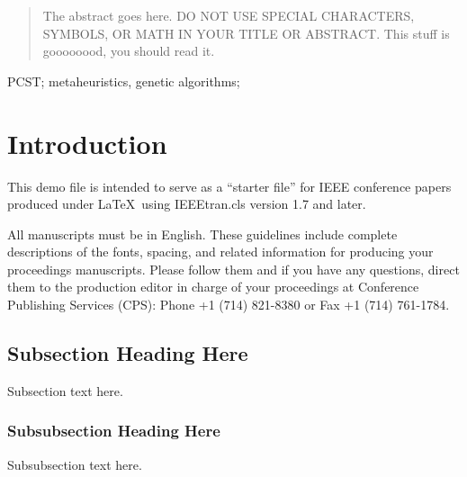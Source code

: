 \documentclass[10pt, conference, compsocconf]{IEEEtran}
\begin{document}
\maketitle


\begin{abstract}
The abstract goes here. DO NOT USE SPECIAL CHARACTERS, SYMBOLS, OR MATH IN YOUR TITLE OR ABSTRACT. This stuff is goooooood, you should read it.

\end{abstract}

\begin{IEEEkeywords}
PCST; metaheuristics, genetic algorithms;

\end{IEEEkeywords}


%
\IEEEpeerreviewmaketitle



\section{Introduction}
This demo file is intended to serve as a ``starter file''
for IEEE conference papers produced under \LaTeX\ using
IEEEtran.cls version 1.7 and later.

All manuscripts must be in English. These guidelines include complete descriptions of the fonts, spacing, and related information for producing your proceedings manuscripts. Please follow them and if you have any questions, direct them to the production editor in charge of your proceedings at Conference Publishing Services (CPS): Phone +1 (714) 821-8380 or Fax +1 (714) 761-1784.



\subsection{Subsection Heading Here}
Subsection text here.


\subsubsection{Subsubsection Heading Here}
Subsubsection text here.
\end{document}
